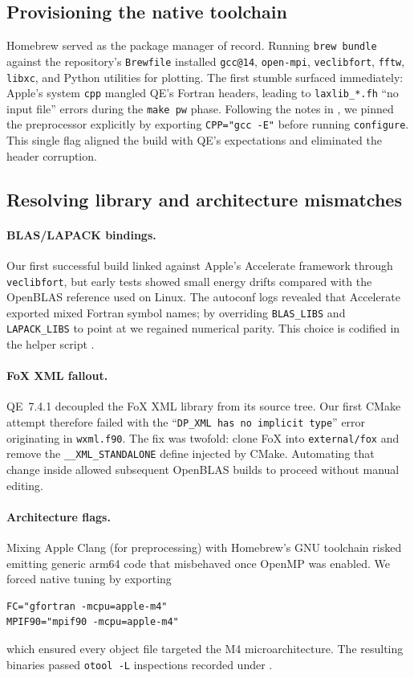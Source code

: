 \documentclass[12pt]{article}
\begin{document}
\subsection{Provisioning the native toolchain}
Homebrew served as the package manager of record. Running \verb|brew bundle| against the repository's \texttt{Brewfile} installed \texttt{gcc@14}, \texttt{open-mpi}, \texttt{veclibfort}, \texttt{fftw}, \texttt{libxc}, and Python utilities for plotting. The first stumble surfaced immediately: Apple's system \texttt{cpp} mangled QE's Fortran headers, leading to \verb|laxlib_*.fh| ``no input file'' errors during the \texttt{make pw} phase. Following the notes in , we pinned the preprocessor explicitly by exporting \verb|CPP="gcc -E"| before running \texttt{configure}. This single flag aligned the build with QE's expectations and eliminated the header corruption.

\subsection{Resolving library and architecture mismatches}
\paragraph{BLAS/LAPACK bindings.} Our first successful build linked against Apple's Accelerate framework through \texttt{veclibfort}, but early tests showed small energy drifts compared with the OpenBLAS reference used on Linux. The autoconf logs revealed that Accelerate exported mixed Fortran symbol names; by overriding \verb|BLAS_LIBS| and \verb|LAPACK_LIBS| to point at  we regained numerical parity. This choice is codified in the helper script .

\paragraph{FoX XML fallout.} QE~7.4.1 decoupled the FoX XML library from its source tree. Our first CMake attempt therefore failed with the ``\texttt{DP\_XML has no implicit type}'' error originating in \texttt{wxml.f90}. The fix was twofold: clone FoX into \texttt{external/fox} and remove the \texttt{\_\_XML\_STANDALONE} define injected by CMake. Automating that change inside  allowed subsequent OpenBLAS builds to proceed without manual editing.

\paragraph{Architecture flags.} Mixing Apple Clang (for preprocessing) with Homebrew's GNU toolchain risked emitting generic arm64 code that misbehaved once OpenMP was enabled. We forced native tuning by exporting
\begin{lstlisting}[frame=single]
FC="gfortran -mcpu=apple-m4"
MPIF90="mpif90 -mcpu=apple-m4"
\end{lstlisting}
which ensured every object file targeted the M4 microarchitecture. The resulting binaries passed \texttt{otool -L} inspections recorded under .
\end{document}
